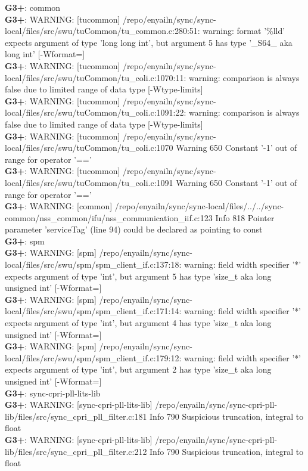 \documentclass[12pt,twoside]{article}
\begin{document}
\textbf{G3+}: common\\ 
\textbf{G3+}: WARNING: [tucommon] /repo/enyailn/sync/sync-local/files/src/swu/tuCommon/tu\_common.c:280:51: warning: format '\%lld' expects argument of type 'long long int', but argument 5 has type '\_S64\_ {aka long int}' [-Wformat=]\\ 
\textbf{G3+}: WARNING: [tucommon] /repo/enyailn/sync/sync-local/files/src/swu/tuCommon/tu\_coli.c:1070:11: warning: comparison is always false due to limited range of data type [-Wtype-limits]\\ 
\textbf{G3+}: WARNING: [tucommon] /repo/enyailn/sync/sync-local/files/src/swu/tuCommon/tu\_coli.c:1091:22: warning: comparison is always false due to limited range of data type [-Wtype-limits]\\ 
\textbf{G3+}: WARNING: [tucommon] /repo/enyailn/sync/sync-local/files/src/swu/tuCommon/tu\_coli.c:1070 Warning 650 Constant '-1' out of range for operator '=='\\ 
\textbf{G3+}: WARNING: [tucommon] /repo/enyailn/sync/sync-local/files/src/swu/tuCommon/tu\_coli.c:1091 Warning 650 Constant '-1' out of range for operator '=='\\ 
\textbf{G3+}: WARNING: [common] /repo/enyailn/sync/sync-local/files/../../sync-common/nss\_common/ifu/nss\_communication\_iif.c:123 Info 818 Pointer parameter 'serviceTag' (line 94) could be declared as pointing to const\\ 
  
\textbf{G3+}: spm\\ 
\textbf{G3+}: WARNING: [spm] /repo/enyailn/sync/sync-local/files/src/swu/spm/spm\_client\_if.c:137:18: warning: field width specifier '*' expects argument of type 'int', but argument 5 has type 'size\_t {aka long unsigned int}' [-Wformat=]\\ 
\textbf{G3+}: WARNING: [spm] /repo/enyailn/sync/sync-local/files/src/swu/spm/spm\_client\_if.c:171:14: warning: field width specifier '*' expects argument of type 'int', but argument 4 has type 'size\_t {aka long unsigned int}' [-Wformat=]\\ 
\textbf{G3+}: WARNING: [spm] /repo/enyailn/sync/sync-local/files/src/swu/spm/spm\_client\_if.c:179:12: warning: field width specifier '*' expects argument of type 'int', but argument 2 has type 'size\_t {aka long unsigned int}' [-Wformat=]\\ 
  
\textbf{G3+}: sync-cpri-pll-lits-lib\\ 
\textbf{G3+}: WARNING: [sync-cpri-pll-lits-lib] /repo/enyailn/sync/sync-cpri-pll-lib/files/src/sync\_cpri\_pll\_filter.c:181 Info 790 Suspicious truncation, integral to float\\ 
\textbf{G3+}: WARNING: [sync-cpri-pll-lits-lib] /repo/enyailn/sync/sync-cpri-pll-lib/files/src/sync\_cpri\_pll\_filter.c:212 Info 790 Suspicious truncation, integral to float\\ 
  
\end{document}
